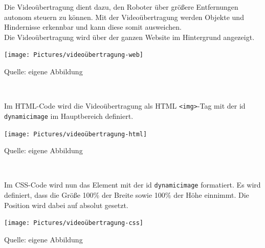 \documentclass[ngerman,12pt,a4paper]{article}
\begin{document}
	Die Videoübertragung dient dazu, den Roboter über größere Entfernungen autonom steuern zu können. Mit der Videoübertragung werden Objekte und Hindernisse erkennbar und kann diese somit ausweichen. \\[0.5cm]
	Die Videoübertragung wird über der ganzen Website im Hintergrund angezeigt. \\
	\begin{center}
		\begin{minipage}[t]{1\textwidth}
			\texttt{[image: Pictures/videoübertragung-web]}
			\label{fig:videoübertragung-web}
			\vspace{-10pt}
			\begin{center}
				\par\small Quelle: eigene Abbildung 
			\end{center}
		\end{minipage} \\[0.75cm]
	\end{center}
	Im HTML-Code wird die Videoübertragung als HTML \texttt{<img>}-Tag mit der id \texttt{dynamicimage} im Hauptbereich definiert. \\
	\begin{center}
		\begin{minipage}[t]{0.75\textwidth}
			\texttt{[image: Pictures/videoübertragung-html]}
			\label{fig:videoübertragung-html}
			\vspace{-10pt}
			\begin{center}
				\par\small Quelle: eigene Abbildung 
			\end{center}
		\end{minipage} \\[0.75cm]
	\end{center}
	Im CSS-Code wird nun das Element mit der id \texttt{dynamicimage} formatiert. Es wird definiert, dass die Größe 100\% der Breite sowie 100\% der Höhe einnimmt. Die Position wird dabei auf absolut gesetzt. \\
	\begin{center}
		\begin{minipage}[t]{0.5\textwidth}
			\texttt{[image: Pictures/videoübertragung-css]}
			\label{fig:videoübertragung-css}
			\vspace{-10pt}
			\begin{center}
				\par\small Quelle: eigene Abbildung 
			\end{center}
		\end{minipage} \\[0.75cm]
	\end{center}
\end{document}
